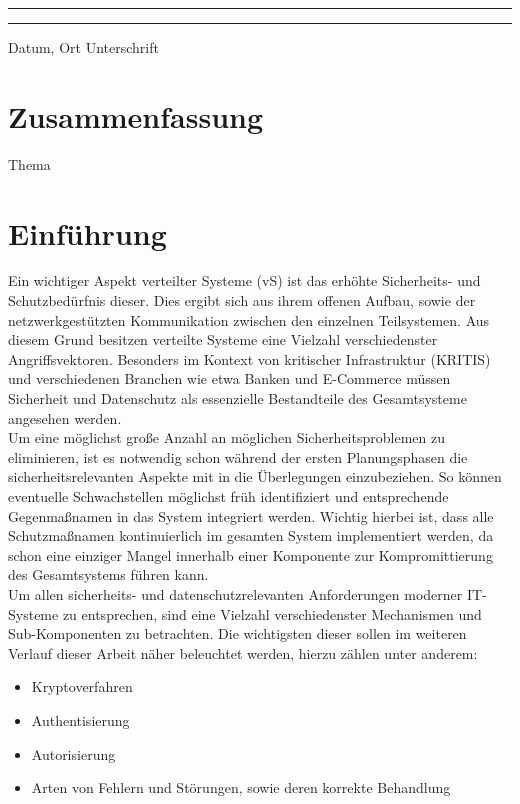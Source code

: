 \documentclass[12pt,a4paper,parskip=half]{scrreprt}
\begin{document}
\vfill
\noindent\rule{5cm}{.4pt}\hfill\rule{5cm}{.4pt}\par
\noindent Datum, Ort \hfill Unterschrift 

\newpage
\thispagestyle{empty}
\chapter*{Zusammenfassung}

Thema
\\
\bigskip

\tableofcontents
{}

\listoffigures
{} 


\chapter{Einführung}

Ein wichtiger Aspekt verteilter Systeme (vS) ist das erhöhte Sicherheits- und Schutzbedürfnis dieser. Dies ergibt sich aus ihrem offenen Aufbau, sowie der netzwerkgestützten Kommunikation zwischen den einzelnen Teilsystemen. Aus diesem Grund besitzen verteilte Systeme eine Vielzahl verschiedenster Angriffsvektoren. Besonders im Kontext von kritischer Infrastruktur (KRITIS) und verschiedenen Branchen wie etwa Banken und E-Commerce müssen Sicherheit und Datenschutz als essenzielle Bestandteile des Gesamtsysteme angesehen werden.
\\
Um eine möglichst große Anzahl an möglichen Sicherheitsproblemen zu eliminieren, ist es notwendig schon während der ersten Planungsphasen die sicherheitsrelevanten Aspekte mit in die Überlegungen einzubeziehen. So können eventuelle Schwachstellen möglichst früh identifiziert und entsprechende Gegenmaßnamen in das System integriert werden. Wichtig hierbei ist, dass alle Schutzmaßnamen kontinuierlich im gesamten System implementiert werden, da schon eine einziger Mangel innerhalb einer Komponente zur Kompromittierung des Gesamtsystems führen kann.
\\
Um allen sicherheits- und datenschutzrelevanten Anforderungen moderner IT-Systeme zu entsprechen, sind eine Vielzahl verschiedenster Mechanismen und Sub-Komponenten zu betrachten. Die wichtigsten dieser sollen im weiteren Verlauf dieser Arbeit näher beleuchtet werden, hierzu zählen unter anderem:

\begin{itemize}
	\item Kryptoverfahren
	\item Authentisierung
	\item Autorisierung
	\item Arten von Fehlern und Störungen, sowie deren korrekte Behandlung
\end{itemize}
\end{document}
